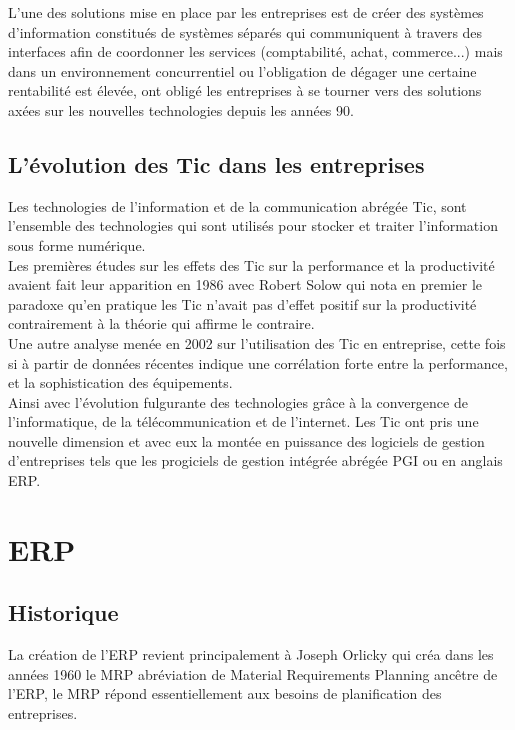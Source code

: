         L’une des solutions mise en place par les entreprises est de créer des systèmes d’information constitués de systèmes séparés qui communiquent à travers des interfaces afin de coordonner les services (comptabilité, achat, commerce...) mais dans un environnement concurrentiel ou l’obligation de dégager une certaine rentabilité est élevée, ont obligé les entreprises à se tourner vers des solutions axées sur les nouvelles technologies depuis les années 90.

    \subsection{L’évolution des Tic dans les entreprises}
        Les technologies de l’information et de la communication abrégée Tic, sont l’ensemble des technologies qui sont utilisés pour stocker et traiter l’information sous forme numérique.\\

        Les premières études sur les effets des Tic sur la performance et la productivité avaient fait leur apparition en 1986 avec Robert Solow qui nota en premier le paradoxe qu’en pratique les Tic n’avait pas d’effet positif sur la productivité contrairement à la théorie qui affirme le contraire.\\

        Une autre analyse menée en 2002 sur l’utilisation des Tic en entreprise, cette fois si à partir de données récentes indique une corrélation forte entre la performance, et la sophistication des équipements.\\

        Ainsi avec l’évolution fulgurante des technologies grâce à la convergence de l’informatique, de la télécommunication et de l’internet. Les Tic ont pris une nouvelle dimension et avec eux la montée en puissance des logiciels de gestion d’entreprises tels que les progiciels de gestion intégrée abrégée PGI ou en anglais ERP.

\section{ERP}
    \subsection{Historique}
        La création de l’ERP revient principalement à Joseph Orlicky qui créa dans les années 1960 le MRP abréviation de Material Requirements Planning ancêtre de l’ERP, le MRP répond essentiellement aux besoins de planification des entreprises.\\
        
